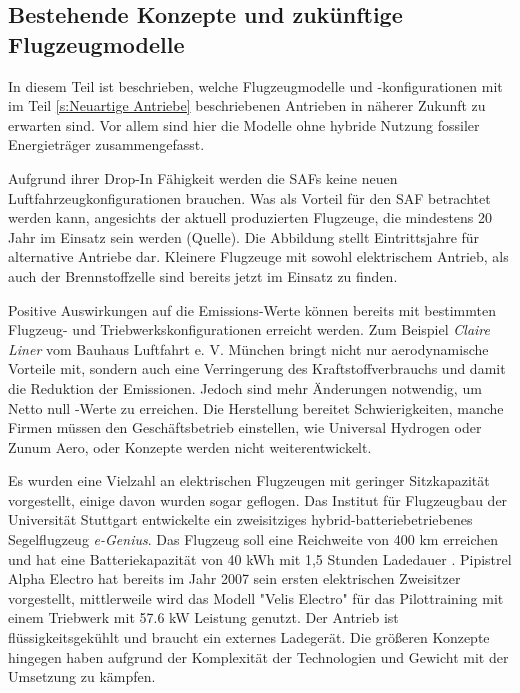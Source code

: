 \subsection{Bestehende Konzepte und zukünftige Flugzeugmodelle}
In diesem Teil ist beschrieben, welche Flugzeugmodelle und -konfigurationen 
mit im Teil \ref{s:Neuartige Antriebe} beschriebenen Antrieben in näherer Zukunft zu erwarten sind. 
Vor allem sind hier die Modelle ohne hybride Nutzung fossiler Energieträger zusammengefasst.

Aufgrund ihrer Drop-In Fähigkeit werden die SAFs keine neuen Luftfahrzeugkonfigurationen brauchen. 
Was als Vorteil für den SAF betrachtet werden kann, angesichts der aktuell produzierten Flugzeuge, 
die mindestens 20 Jahr im Einsatz sein werden (Quelle).
Die Abbildung stellt Eintrittsjahre für alternative Antriebe dar.
Kleinere Flugzeuge mit sowohl elektrischem Antrieb, als auch der Brennstoffzelle sind bereits jetzt im Einsatz zu finden.

%
Positive Auswirkungen auf die Emissions-Werte können bereits mit bestimmten 
Flugzeug- und Triebwerkskonfigurationen erreicht werden.
Zum Beispiel \textit{Claire Liner} vom Bauhaus Luftfahrt e. V. München 
bringt nicht nur aerodynamische Vorteile mit, sondern auch eine Verringerung 
des Kraftstoffverbrauchs und damit die Reduktion der Emissionen.
Jedoch sind mehr Änderungen notwendig, um Netto null -Werte zu erreichen.
Die Herstellung bereitet Schwierigkeiten, manche Firmen müssen den Geschäftsbetrieb einstellen, 
wie Universal Hydrogen oder Zunum Aero, oder Konzepte werden nicht weiterentwickelt.

Es wurden eine Vielzahl an elektrischen Flugzeugen mit geringer 
Sitzkapazität vorgestellt, einige davon wurden sogar geflogen.
Das Institut für Flugzeugbau der Universität Stuttgart entwickelte 
ein zweisitziges hybrid-batteriebetriebenes Segelflugzeug \textit{e-Genius}. 
Das Flugzeug soll eine Reichweite von 400 km erreichen und hat eine 
Batteriekapazität von 40 kWh mit 1,5 Stunden Ladedauer \cite{IFB_eGenius_2025}.
Pipistrel Alpha Electro hat bereits im Jahr 2007 sein ersten elektrischen Zweisitzer vorgestellt, 
mittlerweile wird das Modell "Velis Electro" \cite{Pipistrel_VelisElectro} für 
das Pilottraining mit einem Triebwerk mit 57.6 kW Leistung genutzt. 
Der Antrieb ist flüssigkeitsgekühlt und braucht ein externes Ladegerät.
Die größeren Konzepte hingegen haben aufgrund der Komplexität der Technologien 
und Gewicht mit der Umsetzung zu kämpfen.\\


